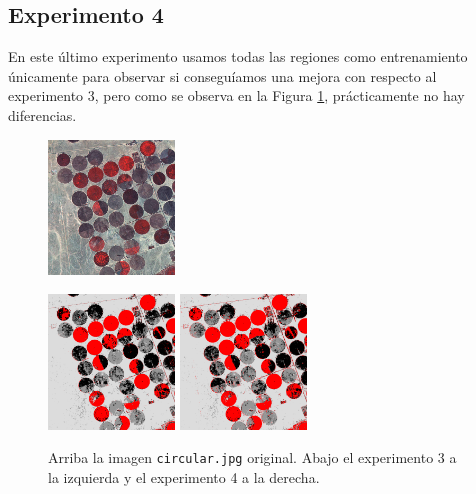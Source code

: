\documentclass[a4paper,11pt]{article}
\begin{document}
\newpage
\subsection{Experimento 4}
En este último experimento usamos todas las regiones como entrenamiento únicamente para observar si conseguíamos una mejora con respecto al experimento 3, pero como se observa en la Figura \ref{ej3-caso4}, prácticamente no hay diferencias.

\begin{figure}[h!]
\centering
\includegraphics[width=0.3\textwidth]{img/circular.jpg}

\includegraphics[width=0.3\textwidth]{img/ej3-caso3-equi-clasif.png}
\includegraphics[width=0.3\textwidth]{img/ej3-caso4-equi-clasif.png} 

\caption{Arriba la imagen {\tt circular.jpg} original. Abajo el experimento 3 a la izquierda y el experimento 4 a la derecha.}
\label{ej3-caso4}
\end{figure}
\end{document}
